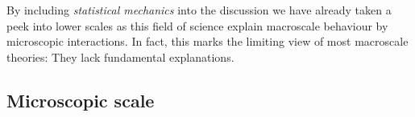 By including \textit{statistical mechanics} into the discussion we have already taken a peek into lower scales as this field of science explain macroscale behaviour by microscopic interactions. In fact, this marks the limiting view of most macroscale theories:  They lack fundamental explanations. 











\subsection{Microscopic scale}




